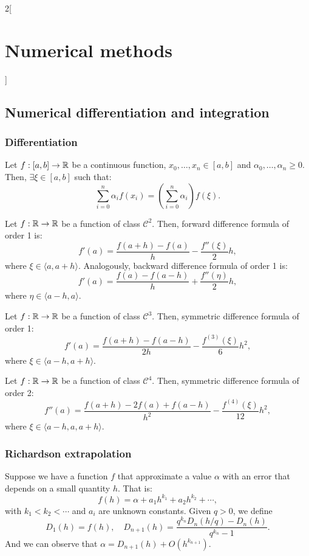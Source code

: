 \documentclass[../../../main.tex]{subfiles}
\begin{document}
\begin{multicols}{2}[\section{Numerical methods}]
\subsection{Numerical differentiation and integration}
\subsubsection*{Differentiation}
\begin{theorem}
    Let $f:[a,b]\rightarrow\mathbb{R}$ be a continuous function, $x_0,\ldots,x_n\in[a,b]$ and $\alpha_0,\ldots,\alpha_n\geq 0$. Then, $\exists\xi\in[a,b]$ such that: $$\sum_{i=0}^n\alpha_if(x_i)=\left(\sum_{i=0}^n\alpha_i\right)f(\xi).$$
\end{theorem}
\begin{theorem}
    Let $f:\mathbb{R}\rightarrow\mathbb{R}$ be a function of class $\mathcal{C}^2$. Then, forward difference formula of order 1 is: $$f'(a)=\frac{f(a+h)-f(a)}{h}-\frac{f''(\xi)}{2}h,$$ where $\xi\in\langle a,a+h\rangle$. Analogously, backward difference formula of order 1 is: $$f'(a)=\frac{f(a)-f(a-h)}{h}+\frac{f''(\eta)}{2}h,$$ where $\eta\in\langle a-h,a\rangle$.
\end{theorem}
\begin{theorem}
    Let $f:\mathbb{R}\rightarrow\mathbb{R}$ be a function of class $\mathcal{C}^3$. Then, symmetric difference formula of order 1: $$f'(a)=\frac{f(a+h)-f(a-h)}{2h}-\frac{f^{(3)}(\xi)}{6}h^2,$$ where $\xi\in\langle a-h,a+h\rangle$.
\end{theorem}
\begin{theorem}
    Let $f:\mathbb{R}\rightarrow\mathbb{R}$ be a function of class $\mathcal{C}^4$. Then, symmetric difference formula of order 2: $$f''(a)=\frac{f(a+h)-2f(a)+f(a-h)}{h^2}-\frac{f^{(4)}(\xi)}{12}h^2,$$ where $\xi\in\langle a-h,a,a+h\rangle$.
\end{theorem}
\subsubsection*{Richardson extrapolation}
\begin{theorem}
    Suppose we have a function $f$ that approximate a value $\alpha$ with an error that depends on a small quantity $h$. That is: $$f(h)=\alpha+a_1h^{k_1}+a_2h^{k_2}+\cdots,$$with $k_1<k_2<\cdots$ and $a_i$ are unknown constants. Given $q>0$, we define $$D_1(h)=f(h),\quad D_{n+1}(h)=\frac{q^{k_n}D_n\left(h/q\right)-D_n(h)}{q^{k_n}-1}.$$ And we can observe that $\alpha=D_{n+1}(h)+O(h^{k_{n+1}})$.
\end{theorem}

\end{multicols}
\end{document}

